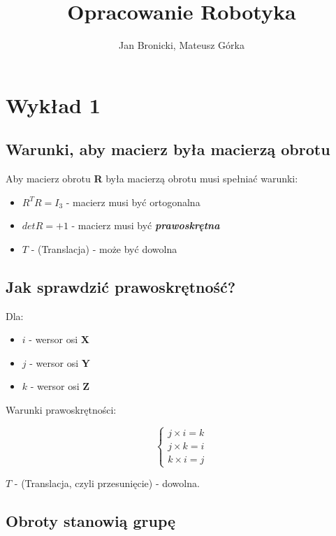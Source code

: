 \documentclass{article}
\title{Opracowanie Robotyka}
\author{Jan Bronicki, Mateusz Górka}
\date{}
\begin{document}
\maketitle

\tableofcontents
\newpage
\section{Wykład 1}


\subsection{Warunki, aby macierz była macierzą obrotu}

Aby macierz obrotu {\bf R} była macierzą obrotu musi spełniać warunki:

\begin{itemize}
    \item $R^{T}R=I_{3}$ - macierz musi być ortogonalna
    \item $det R=+1$ - macierz musi być {\bf \it prawoskrętna}
    \item $T$ - (Translacja) - może być dowolna
\end{itemize}

\subsection{Jak sprawdzić prawoskrętność?}

Dla:

\begin{itemize}
    \item $i$ - wersor osi {\bf X}
    \item $j$ - wersor osi {\bf Y}
    \item $k$ - wersor osi {\bf Z}
\end{itemize}

Warunki prawoskrętności:

\Large
$$
	\left\{
	\begin{array}{l}
		j \times i = k \\
		j \times k = i \\
		k \times i = j
	\end{array}
	\right.
$$
\normalsize

{\bf $T$} - (Translacja, czyli przesunięcie) - dowolna.

\subsection{Obroty stanowią grupę}
\end{document}
